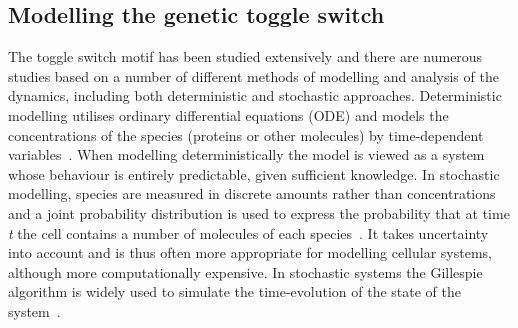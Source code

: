 \subsection{Modelling the genetic toggle switch} 
The toggle switch motif has been studied extensively and there are numerous studies based on a number of different methods of modelling and analysis of the dynamics, including both deterministic and stochastic approaches. Deterministic modelling utilises ordinary differential equations (ODE) and models the concentrations of the species (proteins or other molecules) by time-dependent variables~\autocite{deJong:2002ft}. When modelling deterministically the model is viewed as a system whose behaviour is entirely predictable, given sufficient knowledge. In stochastic modelling, species are measured in discrete amounts rather than concentrations and a joint probability distribution is used to express the probability that at time \textit{t} the cell contains a number of molecules of each species~\autocite{deJong:2002ft,Wilkinson:2006td}. It takes uncertainty into account and is thus often more appropriate for modelling cellular systems, although more computationally expensive. In stochastic systems the Gillespie algorithm is widely used to simulate the time-evolution of the state of the system~\autocite{Warren:2005kea}.
\par
